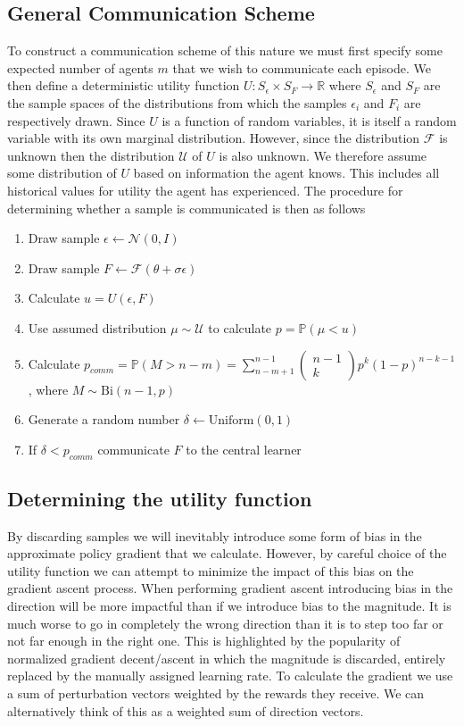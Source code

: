 \subsection{General Communication Scheme}
\label{sec:GeneralScheme}
To construct a communication scheme of this nature we must first specify some expected number of agents $m$ that we wish to communicate each episode.
We then define a deterministic utility function $U: S_\epsilon \times S_F \rightarrow \mathbb{R}$ where $S_\epsilon$ and $S_F$ are the sample spaces of the distributions from which the samples $\epsilon_i$ and $F_i$ are respectively drawn.
Since $U$ is a function of random variables, it is itself a random variable with its own marginal distribution. 
However, since the distribution $\mathcal{F}$ is unknown then the distribution $\mathcal{U}$ of $U$ is also unknown. 
We therefore assume some distribution of $U$ based on information the agent knows. 
This includes all historical values for utility the agent has experienced.
The procedure for determining whether a sample is communicated is then as follows
\begin{enumerate}
    \item Draw sample $\epsilon \leftarrow \mathcal{N}(0,I)$
    \item Draw sample $F \leftarrow \mathcal{F}(\theta + \sigma \epsilon)$
    \item Calculate $u = U(\epsilon,F)$
    \item Use assumed distribution $\mu \sim \mathcal{U}$ to calculate $p=\mathbb{P}(\mu < u)$
    \item Calculate $p_{comm}=\mathbb{P}(M>n-m) = \sum_{n-m+1}^{n-1} \begin{pmatrix}n-1 \\ k\end{pmatrix}p^k(1-p)^{n-k-1}$, where $M \sim \text{Bi}(n-1,p)$
    \item Generate a random number $\delta \leftarrow \text{Uniform}(0,1)$
    \item If $\delta<p_{comm}$ communicate $F$ to the central learner
\end{enumerate}

\subsection{Determining the utility function}
By discarding samples we will inevitably introduce some form of bias in the approximate policy gradient that we calculate. 
However, by careful choice of the utility function we can attempt to minimize the impact of this bias on the gradient ascent process.
When performing gradient ascent introducing bias in the direction will be more impactful than if we introduce bias to the magnitude. 
It is much worse to go in completely the wrong direction than it is to step too far or not far enough in the right one. 
This is highlighted by the popularity of normalized gradient decent/ascent \cite{NGD} in which the magnitude is discarded, entirely replaced by the manually assigned learning rate.
To calculate the gradient we use a sum of perturbation vectors weighted by the rewards they receive. We can alternatively think of this as a weighted sum of direction vectors.

